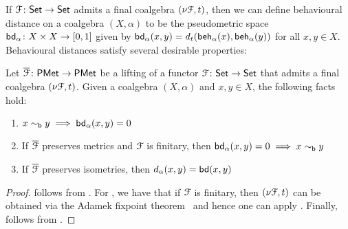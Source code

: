 If $\mathcal{F} \colon {\mathsf{Set}} \to {\mathsf{Set}}$ admits a final coalgebra $(\nu \mathcal{F}, t)$, then we can define behavioural distance on a  coalgebra $(X, \alpha)$ to be the pseudometric space $\bd_\alpha \colon X\times X \to \interval{0}{1}$ given by $\mathsf{bd}_\alpha(x,y) = d_{t}(\mathsf{beh}_{\alpha}(x), \mathsf{beh}_{\alpha}(y))$ for all $x, y \in X$. Behavioural distances satisfy several desirable properties:
\begin{lemma}\label{c2:lem:behavioural_distances_properties}
	Let $\overline{\mathcal{F}} \colon \mathsf{PMet} \to \mathsf{PMet}$ be a lifting of a functor $\mathcal{F} \colon {\mathsf{Set}} \to {\mathsf{Set}}$ that admits a final coalgebra $(\nu \mathcal{F}, t)$. Given a coalgebra $(X, \alpha)$ and $x,y \in X$, the following facts hold:
	\begin{enumerate}
		\item $x \sim_{\mathsf{b}} y \implies \mathsf{bd}_\alpha(x,y)=0$
		\item If $\overline{\mathcal{F}}$ preserves metrics and $\mathcal{F}$ is finitary, then $\mathsf{bd}_\alpha(x,y)=0 \implies x \sim_{\mathsf{b}} y$
		\item If $\overline{\mathcal{F}}$ preserves isometries, then $d_\alpha(x,y) = \mathsf{bd}(x,y)$
	\end{enumerate}
\end{lemma}
\begin{proof}
	 follows from \cite[Lemma~6.6]{Baldan:2018:Coalgebraic}. For , we have that if $\mathcal{F}$ is finitary, then $(\nu \mathcal{F},t)$ can be obtained via the Adamek fixpoint theorem~\cite{Adamek:1995:Greatest} and hence one can apply \cite[Theorem~6.10]{Baldan:2018:Coalgebraic}. Finally,  follows from \cite[Theorem~6.7]{Baldan:2018:Coalgebraic}.
\end{proof}
